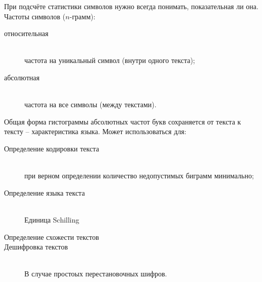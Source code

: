 \documentclass[a4paper]{article}
\newcommand{\eng}[1]{\foreignlanguage{english}{#1}}
\begin{document}
При подсчёте статистики символов нужно всегда понимать, показательная ли она.
Частоты символов ($n$-грамм):
\begin{description}
	\item[относительная] \hfill\\
	частота на уникальный символ (внутри одного текста);
	\item[абсолютная] \hfill\\
	частота на все символы (между текстами).
\end{description}

Общая форма гистограммы абсолютных частот букв сохраняется от текста к тексту -- характеристика языка. Может использоваться для:
\begin{description}
	\item[Определение кодировки текста]\hfill\\
	при верном определении количество недопустимых биграмм минимально;
	\item[Определение языка текста] \hfill\\
	Единица \eng{Schilling}
	\item[Определение схожести текстов]
	\item[Дешифровка текстов] \hfill\\
	В случае простоых перестановочных шифров.
\end{description}


\end{document}
